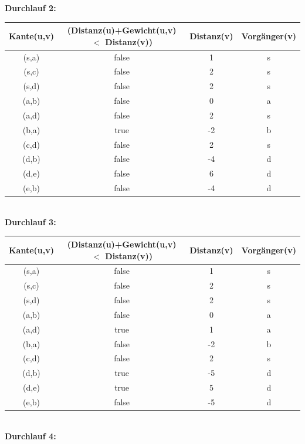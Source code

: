 \documentclass[paper=a4, fontsize=11pt]{scrartcl}
\numberwithin{equation}{section}
\numberwithin{figure}{section}
\numberwithin{table}{section}
\begin{document}
\textbf{Durchlauf 2:} \\

\begin{tabular}{|c||c|c|c|}
\hline
Kante(u,v) & (Distanz(u)+Gewicht(u,v) $<$ Distanz(v)) & Distanz(v) & Vorgänger(v) \\
\hline \hline
(s,a) & false & 1 & s \\\hline
(s,c) & false & 2 & s \\\hline
(s,d) & false & 2 & s \\\hline
(a,b) & false & 0 & a \\\hline
(a,d) & false & 2 & s \\\hline
(b,a) & true & -2 & b \\\hline
(c,d) & false & 2 & s \\\hline
(d,b) & false & -4 & d \\\hline
(d,e) & false & 6 & d \\\hline
(e,b) & false & -4 & d \\\hline
\end{tabular} \\

\textbf{Durchlauf 3:} \\

\begin{tabular}{|c||c|c|c|}
\hline
Kante(u,v) & (Distanz(u)+Gewicht(u,v) $<$ Distanz(v)) & Distanz(v) & Vorgänger(v) \\
\hline \hline
(s,a) & false & 1 & s \\\hline
(s,c) & false & 2 & s \\\hline
(s,d) & false & 2 & s \\\hline
(a,b) & false & 0 & a \\\hline
(a,d) & true & 1 & a \\\hline
(b,a) & false & -2 & b \\\hline
(c,d) & false & 2 & s \\\hline
(d,b) & true & -5 & d \\\hline
(d,e) & true & 5 & d \\\hline
(e,b) & false & -5 & d \\\hline
\end{tabular} \\

\textbf{Durchlauf 4:} \\
\end{document}
